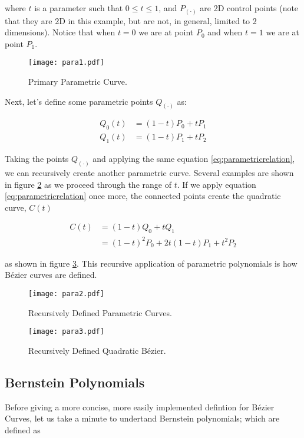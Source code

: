 where $t$ is a parameter such that $0 \leq t \leq 1$, and $P_{(\cdot)}$ are 2D control points (note that they are 2D in this example, but are not, in general, limited to 2 dimensions). Notice that when $t=0$ we are at point $P_0$ and when $t=1$ we are at point $P_1$. 

\begin{figure}[htbp]
	\centering
	\texttt{[image: para1.pdf]}
	\caption{Primary Parametric Curve.}
	\label{fig:para1}
\end{figure}

Next, let's define some parametric points $Q_{(\cdot)}$ as:

\begin{align}
Q_0(t) &=  (1-t)P_0 + tP_1 \\
Q_1(t) &=  (1-t)P_1 + tP_2
 \end{align} 
 
Taking the points $Q_{(\cdot)}$ and applying the same equation \cref{eq:parametricrelation}, we can recursively create another parametric curve. Several examples are shown in figure \cref{fig:para2} as we proceed through the range of $t$. If we apply equation \cref{eq:parametricrelation} once more, the connected points create the quadratic curve, $C(t)$

\begin{align}
C(t) &= (1-t)Q_0 + tQ_1 \\
&= (1-t)^2P_0 + 2t(1-t)P_1+t^2P_2 
\end{align} 

as shown in figure \cref{fig:para3}. This recursive application of parametric polynomials is how Bézier curves are defined.
 
 \begin{figure}[htbp]
 	\centering
 	\texttt{[image: para2.pdf]}
 	\caption{Recursively Defined Parametric Curves.}
 	\label{fig:para2}
 \end{figure}

 
\begin{figure}[htbp]
	\centering
	\texttt{[image: para3.pdf]}
	\caption{Recursively Defined Quadratic Bézier.}
	\label{fig:para3}
\end{figure}


\subsection{Bernstein Polynomials}
Before giving a more concise, more easily implemented defintion for Bézier Curves, let us take a minute to undertand Bernstein polynomials; which are defined as

